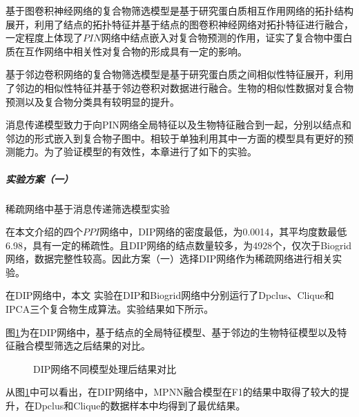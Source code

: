 基于图卷积神经网络的复合物筛选模型是基于研究蛋白质相互作用网络的拓扑结构展开，利用了结点的拓扑特征并基于结点的图卷积神经网络对拓扑特征进行融合，一定程度上体现了$PIN$网络中结点嵌入对复合物预测的作用，证实了复合物中蛋白质在互作网络中相关性对复合物的形成具有一定的影响。

基于邻边卷积网络的复合物筛选模型是基于研究蛋白质之间相似性特征展开，利用了邻边的相似性特征并基于邻边卷积对数据进行融合。生物的相似性数据对复合物预测以及复合物分类具有较明显的提升。

消息传递模型致力于向PIN网络全局特征以及生物特征融合到一起，分别以结点和邻边的形式嵌入到复合物子图中。相较于单独利用其中一方面的模型具有更好的预测能力。为了验证模型的有效性，本章进行了如下的实验。


\subparagraph*{实验方案（一）} 稀疏网络中基于消息传递筛选模型实验

在本文介绍的四个$PPI$网络中，DIP网络的密度最低，为0.0014，其平均度数最低6.98，具有一定的稀疏性。且DIP网络的结点数量较多，为4928个，仅次于Biogrid网络，数据完整性较高。因此方案（一）选择DIP网络作为稀疏网络进行相关实验。

在DIP网络中，本文
实验在DIP和Biogrid网络中分别运行了Dpclus、Clique和IPCA三个复合物生成算法。实验结果如下所示。

图\ref{fig:result/DIP/fusion}为在DIP网络中，基于结点的全局特征模型、基于邻边的生物特征模型以及特征融合模型筛选之后结果的对比。
\begin{figure}[htbp]
    \centering
    \vskip0.2cm
    \caption{DIP网络不同模型处理后结果对比}
    \label{fig:result/DIP/fusion}
\end{figure}

从图\ref{fig:result/DIP/fusion}中可以看出，在DIP网络中，MPNN融合模型在F1的结果中取得了较大的提升，在Dpclus和Clique的数据样本中均得到了最优结果。

